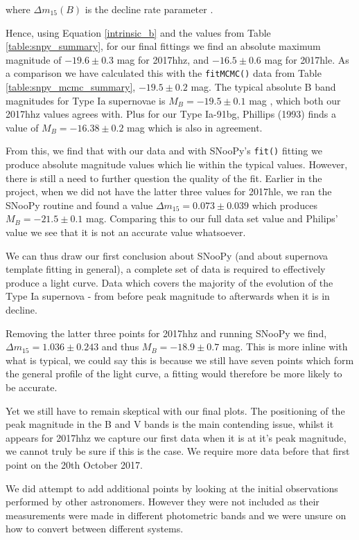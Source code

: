 \documentclass[twocolumn]{revtex4}
\begin{document}
where $\Delta m_{15}(B)$ is the decline rate parameter \cite{high_en_astro}.

Hence, using Equation \ref{intrinsic_b} and the values from Table \ref{table:snpy_summary}, for our final fittings we find an absolute maximum magnitude of $-19.6\pm0.3$ mag for 2017hhz, and $-16.5\pm0.6$ mag for 2017hle. As a comparison we have calculated this with the \texttt{fitMCMC()} data from Table \ref{table:snpy_mcmc_summary}, $-19.5\pm0.2$ mag. The typical absolute B band magnitudes for Type Ia supernovae is $M_B = -19.5 \pm 0.1$ mag \cite{longair}, which both our 2017hhz values agrees with. Plus for our Type Ia-91bg, Phillips (1993) \cite{abs_phil} finds a value of $M_B = -16.38\pm0.2$ mag which is also in agreement. 

From this, we find that with our data and with SNooPy's \texttt{fit()} fitting we produce absolute magnitude values which lie within the typical values. However, there is still a need to further question the quality of the fit. Earlier in the project, when we did not have the latter three values for 2017hle, we ran the SNooPy routine and found a value $\Delta m_{15}=0.073\pm0.039$ which produces $M_B = -21.5\pm0.1$ mag. Comparing this to our full data set value and Philips' value we see that it is not an accurate value whatsoever. 

We can thus draw our first conclusion about SNooPy (and about supernova template fitting in general), a complete set of data is required to effectively produce a light curve. Data which covers the majority of the evolution of the Type Ia supernova - from before peak magnitude to afterwards when it is in decline. 

Removing the latter three points for 2017hhz and running SNooPy we find, $\Delta m_{15}=1.036\pm0.243$ and thus $M_B = -18.9\pm0.7$ mag. This is more inline with what is typical, we could say this is because we still have seven points which form the general profile of the light curve, a fitting would therefore be more likely to be accurate.

Yet we still have to remain skeptical with our final plots. The positioning of the peak magnitude in the B and V bands is the main contending issue, whilst it appears for 2017hhz we capture our first data when it is at it's peak magnitude, we cannot truly be sure if this is the case. We require more data before that first point on the 20th October 2017. 

We did attempt to add additional points by looking at the initial observations performed by other astronomers. However they were not included as their measurements were made in different photometric bands and we were unsure on how to convert between different systems. 
\end{document}
